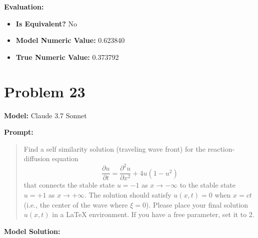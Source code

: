 \documentclass{article}
\begin{document}
\textbf{Evaluation:}
\begin{itemize}
\item \textbf{Is Equivalent?} No
\item \textbf{Model Numeric Value:} 0.623840
\item \textbf{True Numeric Value:} 0.373792
\end{itemize}
\vspace{1cm}
\section*{Problem 23}
\textbf{Model:} Claude 3.7 Sonnet

\textbf{Prompt:}
\begin{quote}
Find a self similarity solution (traveling wave front) for the reaction-diffusion equation $$ \frac{\partial u}{\partial t} = \frac{\partial^2 u}{\partial x^2} + 4u(1 - u^2) $$ that connects the stable state $u=-1$ as $x \to -\infty$ to the stable state $u=+1$ as $x \to +\infty$. The solution should satisfy $u(x,t) = 0$ when $x=ct$ (i.e., the center of the wave where $\xi=0$). Please place your final solution $u(x,t)$ in a \boxed{} LaTeX environment. If you have a free parameter, set it to 2.
\end{quote}
\textbf{Model Solution:}
\end{document}
